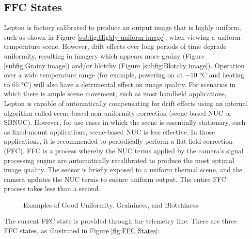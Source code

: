 \subsection{FFC States}
\label{ssec:FFCstates}
Lepton is factory calibrated to produce an output image that is highly uniform,
such as shown in Figure \ref{subfig:Highly uniform image}, when viewing a
uniform-temperature scene. However, drift effects over long periods of time
degrade uniformity, resulting in imagery which appears more grainy (Figure
\ref{subfig:Grainy image}) and/or blotchy (Figure \ref{subfig:Blotchy image}).
Operation over a wide temperature range (for example, powering on at $-10$
\si{\celsius} and heating to $65$ \si{\celsius}) will also have a detrimental
effect on image quality. For scenarios in which there is ample scene movement,
such as most handheld applications, Lepton is capable of automatically
compensating for drift effects using an internal algorithm called scene-based
non-uniformity correction (scene-based NUC or SBNUC). However, for use cases in
which the scene is essentially stationary, such as fixed-mount applications,
scene-based NUC is less effective. In those applications, it is recommended to
periodically perform a flat-field correction (FFC). FFC is a process whereby the
NUC terms applied by the camera's signal processing engine are automatically
recalibrated to produce the most optimal image quality. The sensor is briefly
exposed to a uniform thermal scene, and the camera updates the NUC terms to
ensure uniform output. The entire FFC process takes less than a second.
%
\begin{figure}[htb]
    \centering
     \quad
     \quad
    \caption{Examples of Good Uniformity, Graininess, and Blotchiness}
    \label{fig:exampleffc}
\end{figure}
%
The current FFC state is provided through the telemetry line. There are three
FFC states, as illustrated in Figure \ref{fig:FFC States}:
